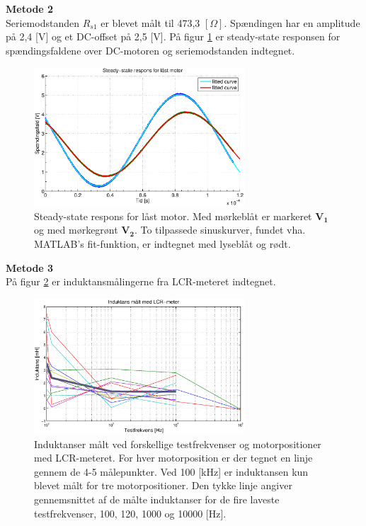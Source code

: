 \textbf{Metode 2}\\
Seriemodstanden \(R_{s1}\) er blevet målt til 473,3 \([\Omega]\).
Spændingen har en amplitude på 2,4 [V] og et DC-offset på 2,5 [V].
På figur \ref{fig:induktans1} er steady-state responsen for spændingsfaldene over DC-motoren og seriemodstanden indtegnet.
\begin{figure}[th!]
	\centering
	\includegraphics[width=0.7\textwidth]{./graphics/induktans1.eps}
	\captionsetup{width=0.7\textwidth}
	\caption[Steady-state respons for låst motor]
		{Steady-state respons for låst motor. Med mørkeblåt er markeret \(\mathbf{V_1}\) og med mørkegrønt \(\mathbf{V_2}\).
		To tilpassede sinuskurver, fundet vha. MATLAB's fit-funktion, er indtegnet med lyseblåt og rødt.}
	\label{fig:induktans1}
\end{figure}

\textbf{Metode 3}\\
På figur \ref{fig:induktans2} er induktansmålingerne fra LCR-meteret indtegnet.
\begin{figure}[th!]
	\centering
	\includegraphics[width=0.7\textwidth]{./graphics/induktans2.eps}
	\captionsetup{width=0.7\textwidth}
	\caption[Induktans målt med LCR-meter]
		{Induktanser målt ved forskellige testfrekvenser og motorpositioner med LCR-meteret.
		For hver motorposition er der tegnet en linje gennem de 4-5 målepunkter.
		Ved 100 [kHz] er induktansen kun blevet målt for tre motorpositioner.
		Den tykke linje angiver gennemsnittet af de målte induktanser for de fire laveste testfrekvenser,
		100, 120, 1000 og 10000 [Hz].}
	\label{fig:induktans2}
\end{figure}

